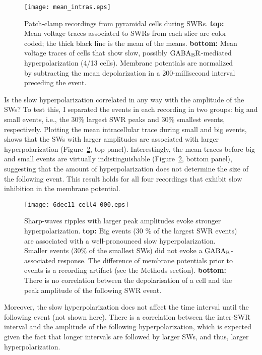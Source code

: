    \begin{figure}
      \center
      \texttt{[image: mean\_intras.eps]}
      \caption{ 
        Patch-clamp recordings from pyramidal cells during SWRs. {\bf top:}
        Mean voltage traces associated to SWRs from each slice are color coded;
        the thick black line is the mean of the means. {\bf bottom:} Mean
        voltage traces of cells that show slow, possibly $\rm GABA_BR$-mediated
        hyperpolarization (4/13 cells). Membrane potentials are normalized by
        subtracting the mean depolarization in a 200-millisecond interval
        preceding the event.
              }
      \label{fig:intra_means}
    \end{figure}

    Is the slow hyperpolarization correlated in any way with the amplitude of
    the SWs? To test this, I separated the events in each recording in two
    groups: big and small events, i.e., the 30\% largest SWR peaks and 30\%
    smallest events, respectively. Plotting the mean intracellular trace during
    small and big events, shows that the SWs with larger amplitudes are
    associated with larger hyperpolarization (Figure~\ref{fig:intra_big_small},
    top panel). Interestingly, the mean traces before big and small events are
    virtually indistinguishable (Figure~\ref{fig:intra_big_small}, bottom
    panel), suggesting that the amount of hyperpolarization does not determine the size
    of the following event. This result holds for all four recordings that
    exhibit slow inhibition in the membrane potential.
    
    \begin{figure}
      \center
      \texttt{[image: 6dec11\_cell4\_000.eps]}
      \caption{ 
        Sharp-waves ripples with larger peak amplitudes evoke stronger
        hyperpolarization. {\bf top:} Big events (30 \% of the largest SWR
        events) are associated with a well-pronounced slow hyperpolarization.
        Smaller events (30\% of the smallest SWs) did not evoke a $\rm
        GABA_B$-associated response. The difference of membrane potentials
        prior to events is a recording artifact (see the Methods section). {\bf
        bottom:} There is no correlation between the depolarisation of a cell
        and the peak amplitude of the following SWR event.
              }
      \label{fig:intra_big_small}
    \end{figure}

    Moreover, the slow hyperpolarization does not affect the time interval
    until the following event (not shown here). There is a correlation between
    the inter-SWR interval and the amplitude of the following hyperpolarization,
    which is expected given the fact that longer intervals are followed by
    larger SWs, and thus, larger hyperpolarization.

